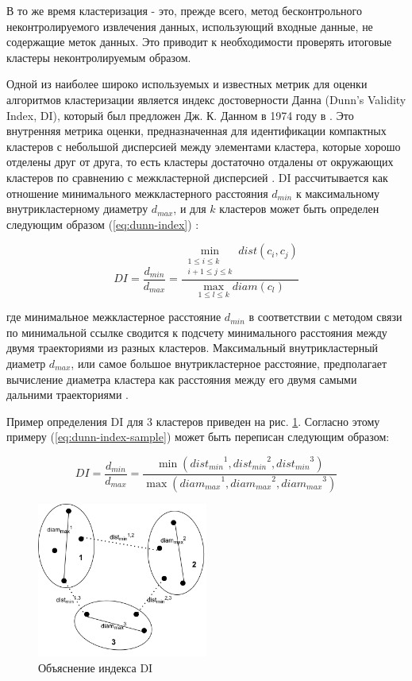 В то же время кластеризация - это, прежде всего, метод бесконтрольного неконтролируемого извлечения данных, использующий входные данные, не содержащие меток данных. Это приводит к необходимости проверять итоговые кластеры неконтролируемым образом.

Одной из наиболее широко используемых и известных метрик для оценки алгоритмов кластеризации является индекс достоверности Данна (Dunn's Validity Index, DI), который был предложен Дж. К. Данном в 1974 году в \cite{article:dunn_orig}. Это внутренняя метрика оценки, предназначенная для идентификации компактных кластеров с небольшой дисперсией между элементами кластера, которые хорошо отделены друг от друга, то есть кластеры достаточно отдалены от окружающих кластеров по сравнению с межкластерной дисперсией \cite{online:hier_clust_r}. DI рассчитывается как отношение минимального межкластерного расстояния $d_{min}$ к максимальному внутрикластерному диаметру $d_{max}$, и для $k$ кластеров может быть определен следующим образом (\ref{eq:dunn-index}) \cite{article:quant_eval_perf_clust}:

\begin{equation} \label{eq:dunn-index}
	DI = \frac {d_{min}} {d_{max}} = \frac{\min\limits_{\substack{1 \leq i \leq k \\ i+1 \leq j \leq k}} dist(c_i, c_j)} {\max\limits_{1 \leq l \leq k} diam(c_l)}
\end{equation}

где минимальное межкластерное расстояние $d_{min}$ в соответствии с методом связи по минимальной ссылке сводится к подсчету минимального расстояния между двумя траекториями из разных кластеров. Максимальный внутрикластерный диаметр $d_{max}$, или самое большое внутрикластерное расстояние, предполагает вычисление диаметра кластера как расстояния между его двумя самыми дальними траекториями \cite{inproceedings:clust_ind}.

Пример определения DI для 3 кластеров приведен на рис. \ref{fig:di_sample}. Согласно этому примеру (\ref{eq:dunn-index-sample}) может быть переписан следующим образом:

\begin{equation} \label{eq:dunn-index-sample}
DI = \frac {d_{min}} {d_{max}} = \frac
	{\min ({dist_{min}}^1, {dist_{min}}^2, {dist_{min}}^3)}
	{\max ({diam_{max}}^1, {diam_{max}}^2, {diam_{max}}^3)}
\end{equation}

\begin{figure}[!htb]
	\centering{}
	\includegraphics[width=0.5\textwidth]{images/di-sample.png}
	\caption{Объяснение индекса DI}
	\label{fig:di_sample}
\end{figure}

